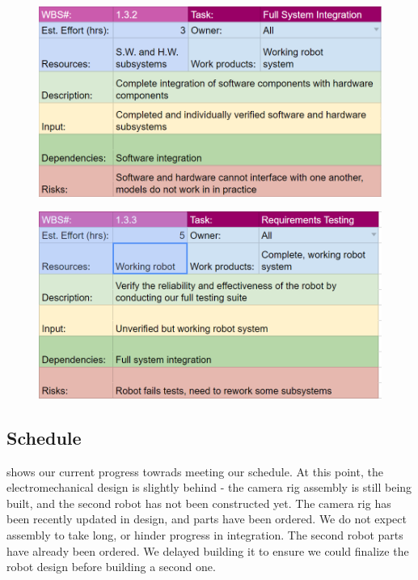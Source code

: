 \begin{figure}[!ht]
\centering
\includegraphics[width=0.98\columnwidth]{wbs_schedule/wbs_dict_int2.PNG}
\label{fig:int1}
\end{figure}
\begin{figure}[!ht]
\centering
\includegraphics[width=0.98\columnwidth]{wbs_schedule/wbs_dict_int3.PNG}
\label{fig:int1}
\end{figure}

\clearpage

\subsection{Schedule}
\label{sec:schedule}

 shows our current progress towrads meeting our schedule. At this point, the electromechanical design is slightly behind - the camera rig assembly is still being built, and the second robot has not been constructed yet. The camera rig has been recently updated in design, and parts have been ordered. We do not expect assembly to take long, or hinder progress in integration. The second robot parts have already been ordered. We delayed building it to ensure we could finalize the robot design before building a second one.

